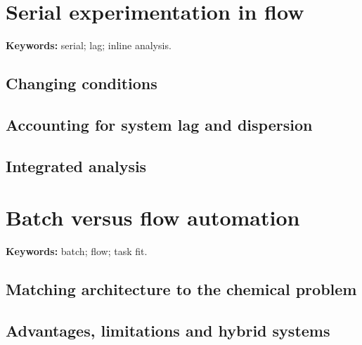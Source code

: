 \section{Serial experimentation in flow}

\begin{methodbox}
\textbf{Keywords:} serial; lag; inline analysis.
\end{methodbox}

\subsection{Changing conditions}


\subsection{Accounting for system lag and dispersion}


\subsection{Integrated analysis}


\section{Batch versus flow automation}

\begin{insightbox}
\textbf{Keywords:} batch; flow; task fit.
\end{insightbox}

\subsection{Matching architecture to the chemical problem}


\subsection{Advantages, limitations and hybrid systems}


